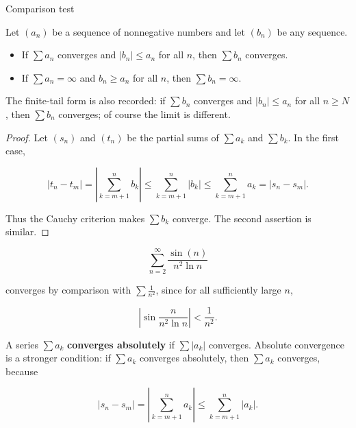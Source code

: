\begin{theorem}{Comparison test}

Let \(\left( a_{n} \right)\) be a sequence of nonnegative numbers and let \(\left( b_{n} \right)\) be any sequence.

\begin{itemize}
\tightlist
\item
  If \(\sum a_{n}\) converges and \(\left| b_{n} \right| \leq a_{n}\) for all \(n\), then \(\sum b_{n}\) converges.
\item
  If \(\sum a_{n} = \infty\) and \(b_{n} \geq a_{n}\) for all \(n\), then \(\sum b_{n} = \infty\).
\end{itemize}

The finite-tail form is also recorded: if \(\sum b_{n}\) converges and \(\left| b_{n} \right| \leq a_{n}\) for all \(n \geq N\), then \(\sum b_{n}\) converges; of course the limit is different.

\end{theorem}

\begin{proof}

Let \(\left( s_{n} \right)\) and \(\left( t_{n} \right)\) be the partial sums of \(\sum a_{k}\) and \(\sum b_{k}\). In the first case,

\[\left| {t_{n} - t_{m}} \right| = \left| {\sum\limits_{k = m + 1}^{n}b_{k}} \right| \leq \sum\limits_{k = m + 1}^{n}\left| b_{k} \right| \leq \sum\limits_{k = m + 1}^{n}a_{k} = \left| {s_{n} - s_{m}} \right|.\]

Thus the Cauchy criterion makes \(\sum b_{k}\) converge. The second assertion is similar.

\end{proof}

\begin{example}

\[\sum\limits_{n = 2}^{\infty}\frac{\sin(n)}{n^{2}\ln n}\]

converges by comparison with \(\sum\frac{1}{n^{2}}\), since for all sufficiently large \(n\),

\[\left| {\sin\frac{n}{n^{2}\ln n}} \right| < \frac{1}{n^{2}}.\]

A series \(\sum a_{k}\) \textbf{converges absolutely} if \(\sum\left| a_{k} \right|\) converges. Absolute convergence is a stronger condition: if \(\sum a_{k}\) converges absolutely, then \(\sum a_{k}\) converges, because

\[\left| {s_{n} - s_{m}} \right| = \left| {\sum\limits_{k = m + 1}^{n}a_{k}} \right| \leq \sum\limits_{k = m + 1}^{n}\left| a_{k} \right|.\]

\end{example}


